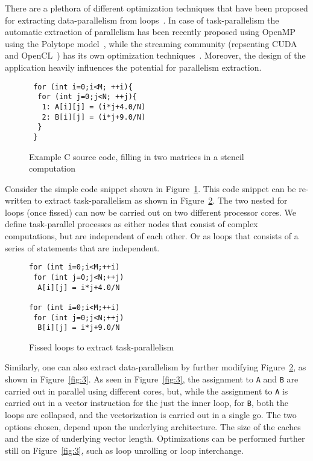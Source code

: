 \documentclass[10pt, conference, compsocconf]{IEEEtran}
\begin{document}
There are a plethora of different optimization techniques that have been
proposed for extracting data-parallelism from
loops~\cite{smuc97,mgri98}. In case of task-parallelism the automatic
extraction of parallelism has been recently proposed using OpenMP using
the Polytope model~\cite{mgri98}, while the streaming community
(repsenting CUDA~\cite{jsan10} and OpenCL~\cite{opencl08}) has its own
optimization techniques~\cite{mgor06}. Moreover, the design of the
application heavily influences the potential for parallelism
extraction. 


\begin{figure}[h!]
  \centering
\begin{verbatim}
 for (int i=0;i<M; ++i){
  for (int j=0;j<N; ++j){
   1: A[i][j] = (i*j+4.0/N)
   2: B[i][j] = (i*j+9.0/N)
  }
 }
\end{verbatim}
  \caption{Example C source code, filling in two matrices in a stencil
    computation}
  \label{fig:1}
\end{figure}

Consider the simple code snippet shown in Figure~\ref{fig:1}. This code
snippet can be re-written to extract task-parallelism as shown in
Figure~\ref{fig:2}. The two nested for loops (once fissed) can now be
carried out on two different processor cores. We define task-parallel
processes as either nodes that consist of complex computations, but are
independent of each other. Or as loops that consists of a series of
statements that are independent.

\begin{figure}[h!]
  \centering
\begin{verbatim}
for (int i=0;i<M;++i)
 for (int j=0;j<N;++j)
  A[i][j] = i*j+4.0/N

for (int i=0;i<M;++i)
 for (int j=0;j<N;++j)
  B[i][j] = i*j+9.0/N
\end{verbatim}
  
  \caption{Fissed loops to extract task-parallelism}
  \label{fig:2}
\end{figure}

Similarly, one can also extract data-parallelism by further modifying
Figure~\ref{fig:2}, as shown in Figure~\ref{fig:3}. As seen in
Figure~\ref{fig:3}, the assignment to \texttt{A} and \texttt{B} are
carried out in parallel using different cores, but, while the assignment
to \texttt{A} is carried out in a vector instruction for the just the
inner loop, for \texttt{B}, both the loops are collapsed, and the
vectorization is carried out in a single go. The two options chosen,
depend upon the underlying architecture. The size of the caches and the
size of underlying vector length. Optimizations can be performed further
still on Figure~\ref{fig:3}, such as loop unrolling or loop interchange.
\end{document}
